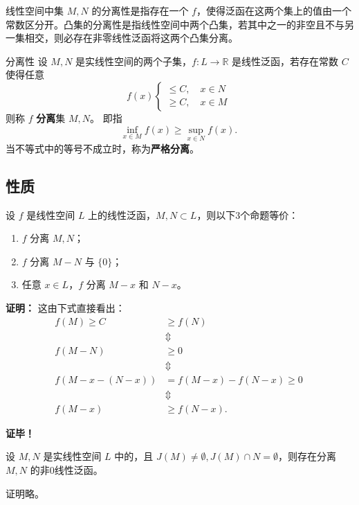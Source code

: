 

线性空间中集 $M,N$ 的分离性是指存在一个 $f$，使得泛函在这两个集上的值由一个常数区分开。凸集的分离性是指线性空间中两个凸集，若其中之一的非空且不与另一集相交，则必存在非零线性泛函将这两个凸集分离。

\begin{definition}{分离性}
设 $M,N$ 是实线性空间的两个子集，$f:L\rightarrow\mathbb R$ 是线性泛函，若存在常数 $C$ 使得任意 
\begin{equation}
f(x)\left\{\begin{aligned}\leq C,\quad x\in N\\
\geq C,\quad x\in M
\end{aligned}\right.~
\end{equation}
则称 $f$ \textbf{分离}集 $M,N$。
即指
\begin{equation}
\inf_{x\in M}f(x)\geq\sup_{x\in N}f(x).~
\end{equation}
当不等式中的等号不成立时，称为\textbf{严格分离}。
\end{definition}
\subsection{性质}
\begin{theorem}{}
设 $f$ 是线性空间 $L$ 上的线性泛函，$M,N\subset L$，则以下3个命题等价：
\begin{enumerate}
\item $f$ 分离 $M,N$；
\item $f$ 分离 $M-N$ 与 $\{0\}$；
\item 任意 $x\in L$，$f$ 分离 $M-x$ 和 $N-x$。
\end{enumerate}
\end{theorem}
\textbf{证明：}
这由下式直接看出：
\begin{equation}
\begin{aligned}
f(M)\geq C&\geq f(N)\\
&\Updownarrow \\
f(M-N)&\geq0\\
&\Updownarrow \\
f(M-x-(N-x))&=f(M-x)-f(N-x)\geq0\\
&\Updownarrow\\
f(M-x)&\geq f(N-x).
\end{aligned}~ 
\end{equation}


\textbf{证毕！}


\begin{theorem}{}
设 $M,N$ 是实线性空间 $L$ 中的，且 $J(M)\neq\emptyset,J(M)\cap N=\emptyset$，则存在分离 $M,N$ 的非0线性泛函。
\end{theorem}
证明略。


